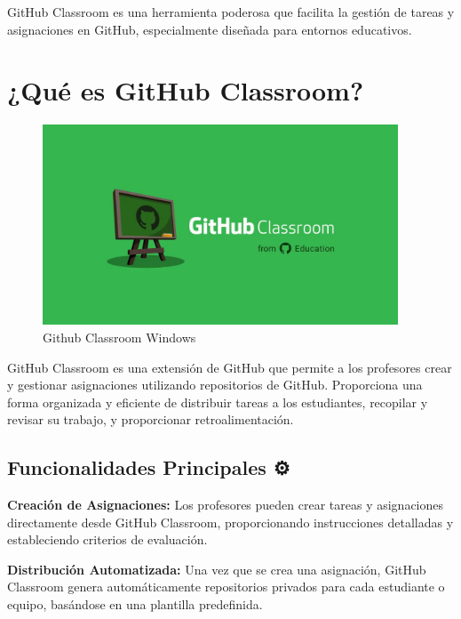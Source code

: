 \documentclass[
  a4paper,
  DIV=11,
  numbers=noendperiod,
  onepage,
  openany]{scrreprt}
\begin{document}
GitHub Classroom es una herramienta poderosa que facilita la gestión de
tareas y asignaciones en GitHub, especialmente diseñada para entornos
educativos.

\section{¿Qué es GitHub Classroom? 🤔}\label{quuxe9-es-github-classroom}

\begin{figure}[H]

{\centering \includegraphics[width=4.16667in,height=\textheight]{unidades/unidad0/../../images/github-classroom-ventana.jpg}

}

\caption{Github Classroom Windows}

\end{figure}%

GitHub Classroom es una extensión de GitHub que permite a los profesores
crear y gestionar asignaciones utilizando repositorios de GitHub.
Proporciona una forma organizada y eficiente de distribuir tareas a los
estudiantes, recopilar y revisar su trabajo, y proporcionar
retroalimentación.

\subsection{Funcionalidades Principales
⚙️}\label{funcionalidades-principales}

\textbf{Creación de Asignaciones:} Los profesores pueden crear tareas y
asignaciones directamente desde GitHub Classroom, proporcionando
instrucciones detalladas y estableciendo criterios de evaluación.

\textbf{Distribución Automatizada:} Una vez que se crea una asignación,
GitHub Classroom genera automáticamente repositorios privados para cada
estudiante o equipo, basándose en una plantilla predefinida.
\end{document}
